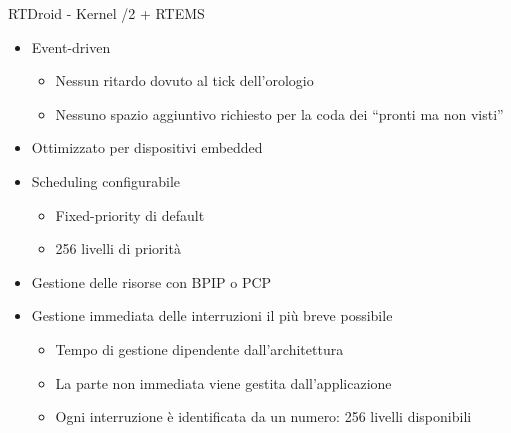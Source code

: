 \begin{frame}{RTDroid - Kernel /2}
	+ RTEMS
	\begin{itemize}
		\item Event-driven
		\begin{itemize}
			\item Nessun ritardo dovuto al tick dell'orologio
			\item Nessuno spazio aggiuntivo richiesto per la coda dei ``pronti ma non visti''
		\end{itemize}
		\item Ottimizzato per dispositivi embedded
		\item Scheduling configurabile
		\begin{itemize}
			\item Fixed-priority di default
			\item 256 livelli di priorità
		\end{itemize}
		\item Gestione delle risorse con BPIP o PCP
		\item Gestione immediata delle interruzioni il più breve possibile
		\begin{itemize}
			\item Tempo di gestione dipendente dall'architettura
			\item La parte non immediata viene gestita dall'applicazione
			\item Ogni interruzione è identificata da un numero: 256 livelli disponibili
		\end{itemize}
	\end{itemize}
\end{frame}